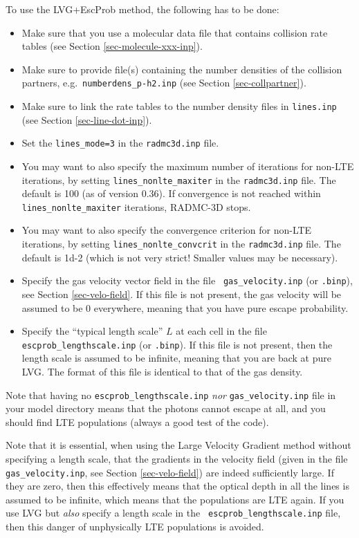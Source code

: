 \documentclass{report}
\begin{document}
To use the LVG+EscProb method, the following has to be done:
\begin{itemize}
\item Make sure that you use a molecular data file that contains
  collision rate tables (see Section \ref{sec-molecule-xxx-inp}).
\item Make sure to provide file(s) containing the number densities
  of the collision partners, e.g.~{\small\tt numberdens\_p-h2.inp}
  (see Section \ref{sec-collpartner}).
\item Make sure to link the rate tables to the number density
  files in {\small\tt lines.inp} (see Section \ref{sec-line-dot-inp}).
\item Set the {\small\tt lines\_mode=3} in the {\small\tt radmc3d.inp} file.
\item You may want to also specify the maximum number of iterations for
  non-LTE iterations, by setting {\small\tt lines\_nonlte\_maxiter} in the
  {\small\tt radmc3d.inp} file. The default is 100 (as of version 0.36). If
  convergence is not reached within {\small\tt lines\_nonlte\_maxiter}
  iterations, RADMC-3D stops.
\item You may want to also specify the convergence criterion
  for non-LTE iterations, by setting {\small\tt lines\_nonlte\_convcrit}
  in the {\small\tt radmc3d.inp} file. The default is 1d-2 (which is
  not very strict! Smaller values may be necessary).
\item Specify the gas velocity vector field in the file {\small\tt
    gas\_velocity.inp} (or {\small\tt .binp}), see Section
  \ref{sec-velo-field}. If this file is not present, the gas velocity will
  be assumed to be 0 everywhere, meaning that you have pure escape
  probability.
\item Specify the ``typical length scale'' $L$ at each cell in the file
  {\small\tt escprob\_lengthscale.inp} (or {\small\tt .binp}). If 
  this file is not present, then the length scale is assumed to be infinite,
  meaning that you are back at pure LVG. The format of this file is
  identical to that of the gas density. 
\end{itemize}

Note that having no {\small\tt escprob\_lengthscale.inp} {\em nor}
{\small\tt gas\_velocity.inp} file in your model directory means that the
photons cannot escape at all, and you should find LTE populations (always a
good test of the code).

Note that it is essential, when using the Large Velocity Gradient method
without specifying a length scale, that the gradients in the velocity field
(given in the file {\small\tt gas\_velocity.inp}, see Section
\ref{sec-velo-field}) are indeed sufficiently large. If they are zero, then
this effectively means that the optical depth in all the lines is assumed to
be infinite, which means that the populations are LTE again. If you use LVG
but {\em also} specify a length scale in the {\small\tt
  escprob\_lengthscale.inp} file, then this danger of unphysically LTE
populations is avoided.
\end{document}
